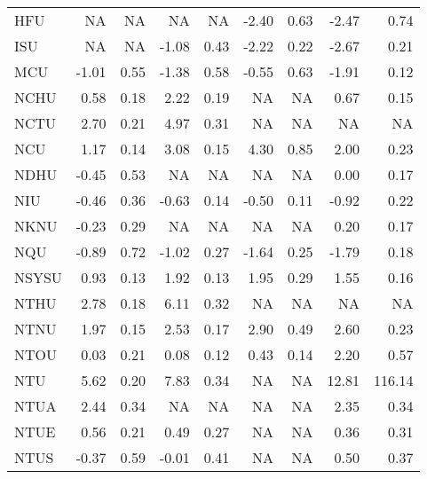 \begin{longtable}[t]{lrrrrrrrr}
\hspace{1em}HFU & NA & NA & NA & NA & -2.40 & 0.63 & -2.47 & 0.74\\
\hspace{1em}ISU & NA & NA & -1.08 & 0.43 & -2.22 & 0.22 & -2.67 & 0.21\\
\hspace{1em}MCU & -1.01 & 0.55 & -1.38 & 0.58 & -0.55 & 0.63 & -1.91 & 0.12\\
\hspace{1em}NCHU & 0.58 & 0.18 & 2.22 & 0.19 & NA & NA & 0.67 & 0.15\\
\hspace{1em}NCTU & 2.70 & 0.21 & 4.97 & 0.31 & NA & NA & NA & NA\\
\hspace{1em}NCU & 1.17 & 0.14 & 3.08 & 0.15 & 4.30 & 0.85 & 2.00 & 0.23\\
\hspace{1em}NDHU & -0.45 & 0.53 & NA & NA & NA & NA & 0.00 & 0.17\\
\hspace{1em}NIU & -0.46 & 0.36 & -0.63 & 0.14 & -0.50 & 0.11 & -0.92 & 0.22\\
\hspace{1em}NKNU & -0.23 & 0.29 & NA & NA & NA & NA & 0.20 & 0.17\\
\hspace{1em}NQU & -0.89 & 0.72 & -1.02 & 0.27 & -1.64 & 0.25 & -1.79 & 0.18\\
\hspace{1em}NSYSU & 0.93 & 0.13 & 1.92 & 0.13 & 1.95 & 0.29 & 1.55 & 0.16\\
\hspace{1em}NTHU & 2.78 & 0.18 & 6.11 & 0.32 & NA & NA & NA & NA\\
\hspace{1em}NTNU & 1.97 & 0.15 & 2.53 & 0.17 & 2.90 & 0.49 & 2.60 & 0.23\\
\hspace{1em}NTOU & 0.03 & 0.21 & 0.08 & 0.12 & 0.43 & 0.14 & 2.20 & 0.57\\
\hspace{1em}NTU & 5.62 & 0.20 & 7.83 & 0.34 & NA & NA & 12.81 & 116.14\\
\hspace{1em}NTUA & 2.44 & 0.34 & NA & NA & NA & NA & 2.35 & 0.34\\
\hspace{1em}NTUE & 0.56 & 0.21 & 0.49 & 0.27 & NA & NA & 0.36 & 0.31\\
\hspace{1em}NTUS & -0.37 & 0.59 & -0.01 & 0.41 & NA & NA & 0.50 & 0.37\\

\end{longtable}
